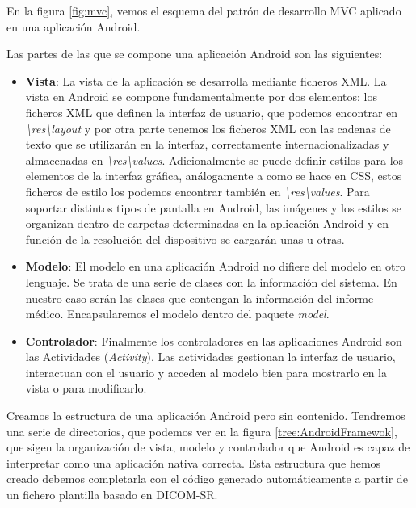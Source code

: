 En la figura \ref{fig:mvc}, vemos el esquema del patrón de desarrollo MVC aplicado en una aplicación Android.\par
Las partes de las que se compone una aplicación Android son las siguientes:
\begin{itemize}
\item \textbf{Vista}: La vista de la aplicación se desarrolla mediante ficheros XML. La vista en Android se compone fundamentalmente por dos elementos: los ficheros XML que definen la interfaz de usuario, que podemos encontrar en \emph{\textbackslash{res}\textbackslash{layout}} y por otra parte tenemos los ficheros XML con las cadenas de texto que se utilizarán en la interfaz, correctamente internacionalizadas y almacenadas en \emph{\textbackslash{res}\textbackslash{values}}. Adicionalmente se puede definir estilos para los elementos de la interfaz gráfica, análogamente a como se hace en CSS, estos ficheros de estilo los podemos encontrar también en \emph{\textbackslash{res}\textbackslash{values}}. Para soportar distintos tipos de pantalla en Android, las imágenes y los estilos se organizan dentro de carpetas determinadas en la aplicación Android y en función de la resolución del dispositivo se cargarán unas u otras.
\item \textbf{Modelo}: El modelo en una aplicación Android no difiere del modelo en otro lenguaje. Se trata de una serie de clases con la información del sistema. En nuestro caso serán las clases que contengan la información del informe médico. Encapsularemos el modelo dentro del paquete \emph{model}.
\item \textbf{Controlador}: Finalmente los controladores en las aplicaciones Android son las Actividades (\emph{Activity}). Las actividades gestionan la interfaz de usuario, interactuan con el usuario y acceden al modelo bien para mostrarlo en la vista o para modificarlo. 
\end{itemize}

Creamos la estructura de una aplicación Android pero sin contenido. Tendremos una serie de directorios, que podemos ver en la figura \ref{tree:AndroidFramewok}, que sigen la organización de vista, modelo y controlador que Android es capaz de interpretar como una aplicación nativa correcta. Esta estructura que hemos creado debemos completarla con el código generado automáticamente a partir de un fichero plantilla basado en DICOM-SR.\par

